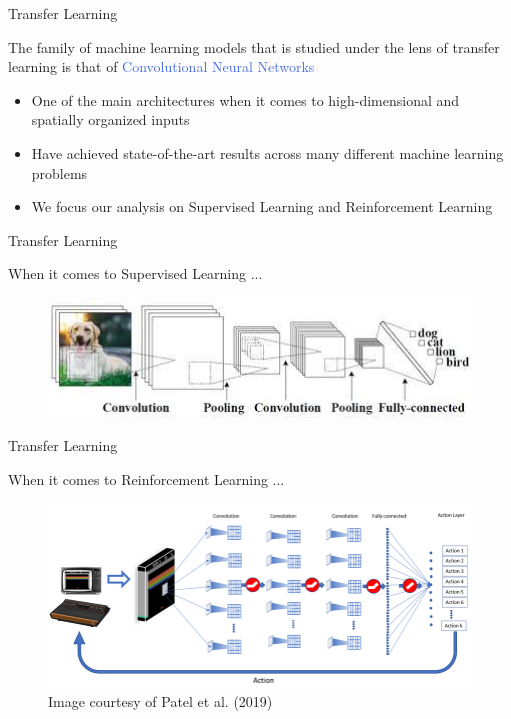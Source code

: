 \documentclass{beamer}
\begin{document}
\begin{frame}{Transfer Learning}

	The family of machine learning models that is studied under the lens of transfer learning is that of \textcolor{RoyalBlue}{Convolutional Neural Networks}
	\bigskip
	\begin{itemize}
		\item One of the main architectures when it comes to high-dimensional and spatially organized inputs
		\item Have achieved state-of-the-art results across many different machine learning problems
		\item We focus our analysis on Supervised Learning and Reinforcement Learning
	\end{itemize}


\end{frame}

\begin{frame}{Transfer Learning}
	
	When it comes to Supervised Learning ...
	\bigskip	
	\begin{figure}
		\includegraphics[width=1\textwidth]{figures/dogo}
	\end{figure}


\end{frame}

\begin{frame}{Transfer Learning}

	When it comes to Reinforcement Learning ...
	\bigskip

	\begin{figure}
		\includegraphics[width=1\textwidth]{figures/dqn}
		\caption{Image courtesy of Patel et al. (2019)}
	\end{figure}

\end{frame}
\end{document}

